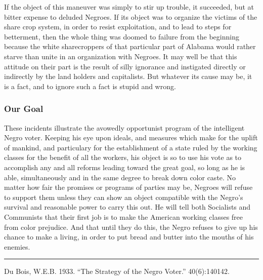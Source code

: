 \documentclass[letterpaper,10pt,english]{jupyterBook}
\begin{document}
\sphinxAtStartPar
If the object of this maneuver was simply to stir up trouble, it succeeded, but at bitter expense to deluded Negroes. If its object was to organize the victims of the share crop system, in order to resist exploitation, and to lead to steps for betterment, then the whole thing was doomed to failure from the beginning because the white sharecroppers of that particular part of Alabama would rather starve than unite in an organization with Negroes. It may well be that this attitude on their part is the result of silly ignorance and instigated directly or indirectly by the land holders and capitalists. But whatever its cause may be, it is a fact, and to ignore such a fact is stupid and wrong.


\subsubsection{Our Goal}
\label{\detokenize{Volumes/40/06/strategy_of_the_negro_voter:our-goal}}
\sphinxAtStartPar
These incidents illustrate the avowedly opportunist program of the intelligent Negro voter. Keeping his eye upon ideals, and measures which make for the uplift of mankind, and particulary for the establishment of a state ruled by the working classes for the benefit of all the workers, his object is so to use his vote as to accomplish any and all reforms leading toward the great goal, so long as he is able, simultaneously and in the same degree to break down color caste. No matter how fair the promises or programs of parties may be, Negroes will refuse to support them unless they can show an object compatible with the Negro’s survival and reasonable power to carry this out. He will tell both Socialists and Communists that their first job is to make the American working classes free from color prejudice. And that until they do this, the Negro refuses to give up his chance to make a living, in order to put bread and butter into the mouths of his enemies.


\bigskip\hrule\bigskip


\sphinxAtStartPar
{} Du Bois, W.E.B. 1933. “The Strategy of the Negro Voter.”  40(6):140\sphinxhyphen{}142.
\end{document}
